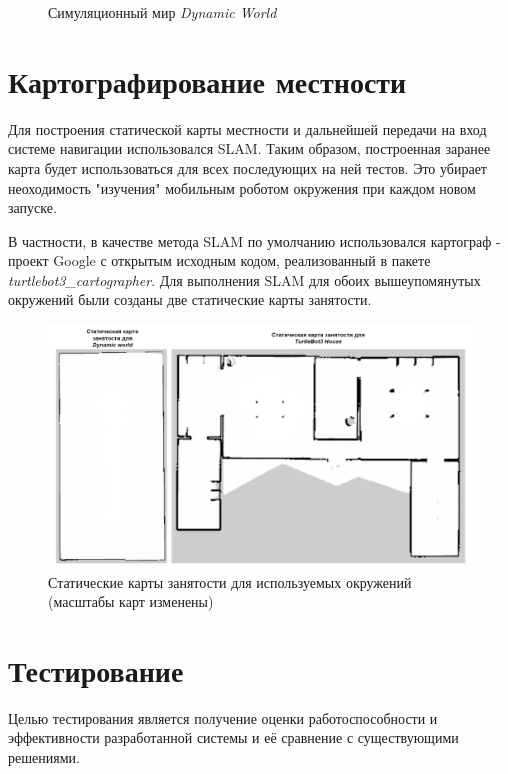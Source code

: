 \begin{enumerate}
\begin{figure}[H]
    \caption{Симуляционный мир \textit{Dynamic World}}
    \label{fig:dyn-world}
\end{figure}
\end{enumerate}

\section{Картографирование местности}

Для построения статической карты местности и дальнейшей передачи на вход системе навигации использовался SLAM. Таким образом, построенная заранее карта будет использоваться для всех последующих на ней тестов. Это убирает неоходимость "изучения" мобильным роботом окружения при каждом новом запуске.

В частности, в качестве метода SLAM по умолчанию использовался картограф - проект Google с открытым исходным кодом, реализованный в пакете \textit{turtlebot3\_cartographer}. Для выполнения SLAM для обоих вышеупомянутых окружений были созданы две статические карты занятости.

\begin{figure}[H]
    \centering
    \includegraphics{images/chap_4/oc-grids.png}
    \caption{Статические карты занятости для используемых окружений (масштабы карт изменены)}
    \label{fig:oc-grids}
\end{figure}

\section{Тестирование}

Целью тестирования является получение оценки работоспособности и эффективности разработанной системы и её сравнение с существующими решениями.

